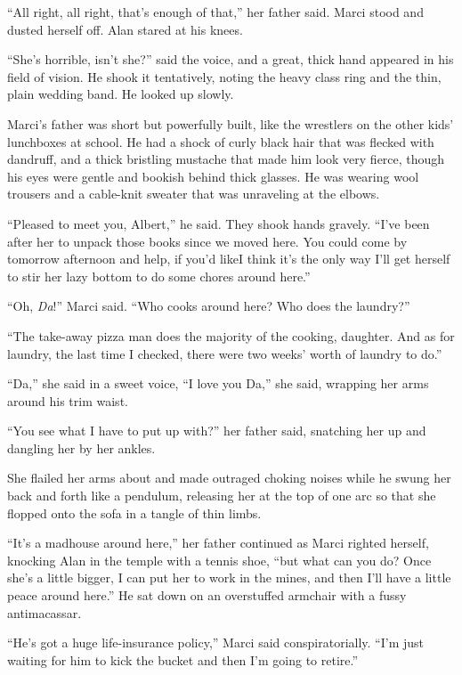 ``All right, all right, that's enough of that,'' her father said. 
Marci stood and dusted herself off.  Alan stared at his knees.

``She's horrible, isn't she?'' said the voice, and a great, thick hand
appeared in his field of vision.  He shook it tentatively, noting the
heavy class ring and the thin, plain wedding band.  He looked up
slowly.

Marci's father was short but powerfully built, like the wrestlers on
the other kids' lunchboxes at school.  He had a shock of curly black
hair that was flecked with dandruff, and a thick bristling mustache
that made him look very fierce, though his eyes were gentle and
bookish behind thick glasses.  He was wearing wool trousers and a
cable-knit sweater that was unraveling at the elbows.

``Pleased to meet you, Albert,'' he said.  They shook hands gravely. 
``I've been after her to unpack those books since we moved here.  You
could come by tomorrow afternoon and help, if you'd like\dash{}I think
it's the only way I'll get herself to stir her lazy bottom to do some
chores around here.''

``Oh, \textit{Da}!'' Marci said.  ``Who cooks around here?  Who does
the laundry?''

``The take-away pizza man does the majority of the cooking, daughter. 
And as for laundry, the last time I checked, there were two weeks'
worth of laundry to do.''

``Da,'' she said in a sweet voice, ``I love you Da,'' she said,
wrapping her arms around his trim waist.

``You see what I have to put up with?'' her father said, snatching her
up and dangling her by her ankles.

She flailed her arms about and made outraged choking noises while he
swung her back and forth like a pendulum, releasing her at the top of
one arc so that she flopped onto the sofa in a tangle of thin limbs.

``It's a madhouse around here,'' her father continued as Marci righted
herself, knocking Alan in the temple with a tennis shoe, ``but what
can you do?  Once she's a little bigger, I can put her to work in the
mines, and then I'll have a little peace around here.'' He sat down on
an overstuffed armchair with a fussy antimacassar.

``He's got a huge life-insurance policy,'' Marci said
conspiratorially.  ``I'm just waiting for him to kick the bucket and
then I'm going to retire.''

